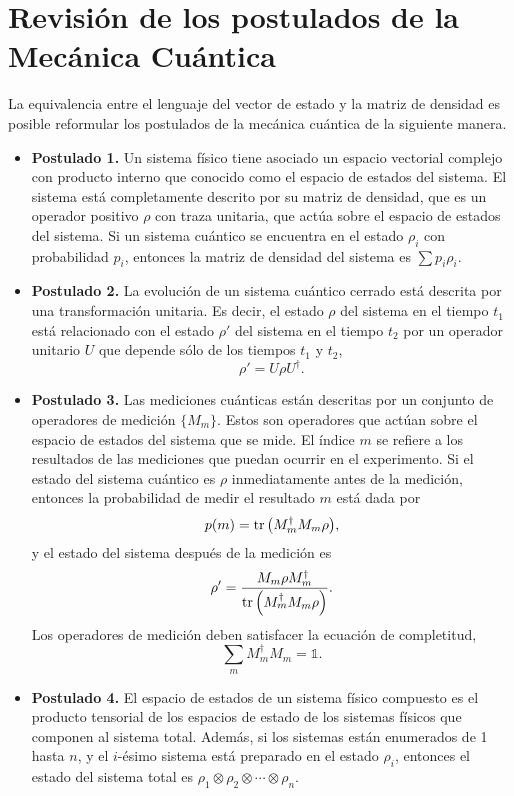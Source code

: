 \documentclass[11pt,dvipsnames]{report}
\begin{document}
\section{Revisión de los postulados de la Mecánica Cuántica}
La equivalencia entre el lenguaje del vector de estado y la matriz de 
densidad es posible reformular los postulados de la mecánica cuántica 
de la siguiente manera.
\begin{itemize}
	\item[] \textbf{Postulado 1.} Un sistema físico tiene asociado un espacio vectorial complejo
	con producto interno que conocido como el espacio de estados del
	sistema. El sistema está completamente descrito por su matriz de densidad,
	que es un operador positivo $\rho$ con traza unitaria, que actúa sobre 
	el espacio de estados del sistema. Si un sistema cuántico se encuentra
	en el estado $\rho _i$ con probabilidad $p_i$, entonces la matriz de
	densidad del sistema es $\sum p_i\rho_i$.
	\item[] \textbf{Postulado 2.} La evolución de un sistema cuántico cerrado está descrita por una transformación
	unitaria. Es decir, el estado $\rho$ del sistema en el tiempo $t_1$ está 
	relacionado con el estado $\rho'$ del sistema en el tiempo $t_2$ por un operador
	unitario $U$ que depende sólo de los tiempos $t_1$ y $t_2$,
	\begin{equation}
	\rho'=U\rho U^{\dagger}.
	\label{eq:postulate1}
	\end{equation}
	\item[] \textbf{Postulado 3.} Las mediciones cuánticas están descritas por un conjunto de 
	operadores de medición $\{M_m\}$. Estos son operadores que actúan sobre el espacio 
	de estados del sistema que se mide. El índice $m$ se refiere a los resultados
	de las mediciones que puedan ocurrir en el experimento. Si el estado del sistema
	cuántico es $\rho$ inmediatamente antes de la medición, entonces la probabilidad
	de medir el resultado $m$ está dada por
	\begin{equation}
	p(m)=\tr \qty(M_m^{\dagger}M_m\rho),
	\label{eq:postulate2_prob}
	\end{equation}						
	y el estado del sistema después de la medición es
	\begin{equation}
	\rho'=\frac{M_m\rho M_m^{\dagger}}{\tr \qty(M_m^{\dagger}M_m\rho)}.
	\label{eq:postulate2_rhoPrime}
	\end{equation}	
	Los operadores de medición deben satisfacer la ecuación de completitud,
	\begin{equation}
	\sum _m M_m^{\dagger}M_m=\mathbb{1}.
	\label{eq:postulate2_completeness}
	\end{equation}
	\item[] \textbf{Postulado 4.} El espacio de estados de un sistema físico compuesto es el producto tensorial 
	de los espacios de estado de los sistemas físicos que componen al sistema total.
	Además, si los sistemas están enumerados de 1 hasta $n$, y el $i$-ésimo sistema
	está preparado en el estado $\rho_i$, entonces el estado del sistema total es
	$\rho_1\otimes\rho_2\otimes\cdots\otimes\rho_n$.
\end{itemize}
\end{document}
